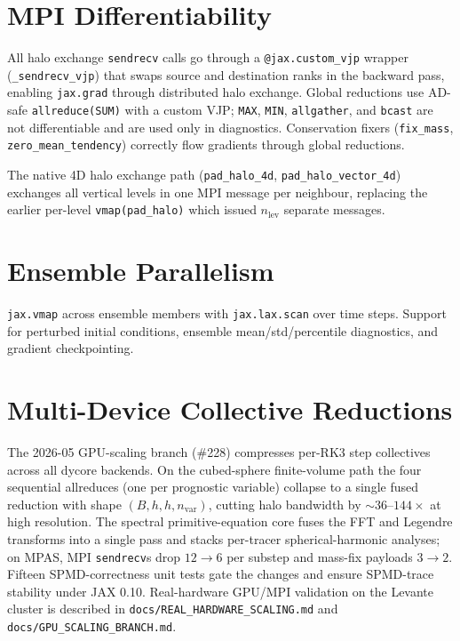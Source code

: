 \documentclass[11pt,twoside]{report}
\begin{document}
\section{MPI Differentiability}

All halo exchange \texttt{sendrecv} calls go through a
\texttt{@jax.custom\_vjp} wrapper (\texttt{\_sendrecv\_vjp}) that swaps
source and destination ranks in the backward pass, enabling
\texttt{jax.grad} through distributed halo exchange.  Global reductions
use AD-safe \texttt{allreduce(SUM)} with a custom VJP; \texttt{MAX},
\texttt{MIN}, \texttt{allgather}, and \texttt{bcast} are not
differentiable and are used only in diagnostics.  Conservation fixers
(\texttt{fix\_mass}, \texttt{zero\_mean\_tendency}) correctly flow
gradients through global reductions.

The native 4D halo exchange path (\texttt{pad\_halo\_4d},
\texttt{pad\_halo\_vector\_4d}) exchanges all vertical levels in one
MPI message per neighbour, replacing the earlier per-level
\texttt{vmap(pad\_halo)} which issued $n_{\mathrm{lev}}$ separate
messages.

\section{Ensemble Parallelism}

\texttt{jax.vmap} across ensemble members with \texttt{jax.lax.scan}
over time steps.  Support for perturbed initial conditions, ensemble
mean/std/percentile diagnostics, and gradient checkpointing.

\section{Multi-Device Collective Reductions}
\label{sec:gpu-scaling}

The 2026-05 GPU-scaling branch (\#228) compresses per-RK3 step
collectives across all dycore backends.  On the cubed-sphere
finite-volume path the four sequential allreduces (one per
prognostic variable) collapse to a single fused reduction with
shape $(B,h,h,n_{\mathrm{var}})$, cutting halo bandwidth by
${\sim}36\text{--}144\times$ at high resolution.  The spectral
primitive-equation core fuses the FFT and Legendre transforms into a
single pass and stacks per-tracer spherical-harmonic analyses; on
MPAS, MPI \texttt{sendrecv}s drop $12\to 6$ per substep and
mass-fix payloads $3\to 2$.  Fifteen SPMD-correctness unit tests
gate the changes and ensure SPMD-trace stability under JAX 0.10.
Real-hardware GPU/MPI validation on the Levante cluster is
described in \texttt{docs/REAL\_HARDWARE\_SCALING.md} and
\texttt{docs/GPU\_SCALING\_BRANCH.md}.
\end{document}

